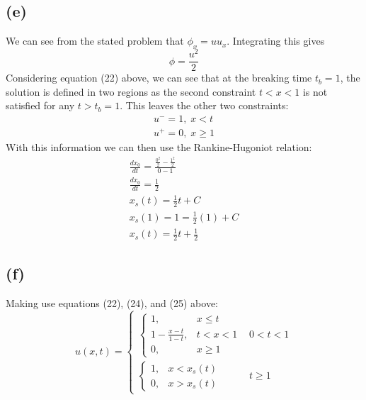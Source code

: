 \documentclass{article}
\begin{document}
\subsection*{(e)}
We can see from the stated problem that $\phi_x = uu_x$. Integrating this gives
\begin{equation}
\phi = \frac{u^2}{2}
\end{equation}
Considering equation (22) above, we can see that at the breaking time $t_b = 1$, the solution is defined in two regions as the second constraint $t < x < 1$ is not satisfied for any $t > t_b = 1$. This leaves the other two constraints:
\begin{equation}
\begin{aligned}
u^- = 1, \; x < t\\
u^+ = 0, \; x \geq 1
\end{aligned}
\end{equation}
With this information we can then use the Rankine-Hugoniot relation:
\begin{equation}
\begin{aligned}
\frac{dx_0}{dt} = \frac{\frac{0^2}{2} - \frac{1^2}{2}}{0 - 1}\\
\frac{dx_0}{dt} = \frac{1}{2}\\
x_s(t) = \frac{1}{2}t + C\\
x_s(1) = 1  = \frac{1}{2}(1) + C\\
x_s(t) = \frac{1}{2}t + \frac{1}{2}
\end{aligned}
\end{equation}
\subsection*{(f)}
Making use equations (22), (24), and (25) above:
\begin{equation}
  u(x,t)=
  \begin{cases}
    \begin{cases}
      1, & x \leq t \\
      1 - \frac{x-t}{1-t}, & t < x < 1\\
      0, & x \geq 1
    \end{cases}
    &0 < t < 1\\
    \begin{cases}
      1,  & x < x_s(t) \\
      0,  & x > x_s(t)
    \end{cases}
    &t\geq 1
  \end{cases}
\end{equation}
\end{document}
